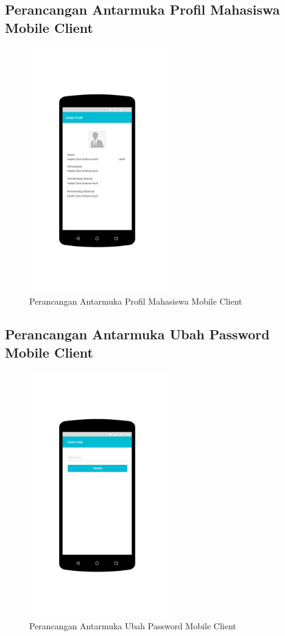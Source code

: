 \subsection{Perancangan Antarmuka Profil Mahasiswa Mobile Client }
	\begin{figure}[H]
		\includegraphics[width=6cm]{figures/diagram/image126.png}
		\centering
		\caption{Perancangan Antarmuka Profil Mahasiswa Mobile Client}
	\end{figure}
\subsection{Perancangan Antarmuka Ubah Password  Mobile Client }
	\begin{figure}[H]
		\includegraphics[width=6cm]{figures/diagram/image127.png}
		\centering
		\caption{Perancangan Antarmuka Ubah Password Mobile Client}
	\end{figure}
